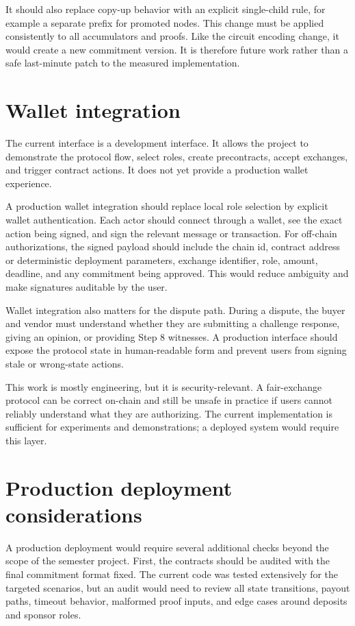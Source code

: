 It should also replace copy-up behavior with an explicit single-child rule, for example a
separate prefix for promoted nodes. This change must be applied consistently to all
accumulators and proofs. Like the circuit encoding change, it would create a new commitment
version. It is therefore future work rather than a safe last-minute patch to the measured
implementation.

\section{Wallet integration}

The current interface is a development interface. It allows the project to demonstrate the
protocol flow, select roles, create precontracts, accept exchanges, and trigger contract
actions. It does not yet provide a production wallet experience.

A production wallet integration should replace local role selection by explicit wallet
authentication. Each actor should connect through a wallet, see the exact action being
signed, and sign the relevant message or transaction. For off-chain authorizations, the
signed payload should include the chain id, contract address or deterministic deployment
parameters, exchange identifier, role, amount, deadline, and any commitment being approved.
This would reduce ambiguity and make signatures auditable by the user.

Wallet integration also matters for the dispute path. During a dispute, the buyer and
vendor must understand whether they are submitting a challenge response, giving an opinion,
or providing Step 8 witnesses. A production interface should expose the protocol state in
human-readable form and prevent users from signing stale or wrong-state actions.

This work is mostly engineering, but it is security-relevant. A fair-exchange protocol can
be correct on-chain and still be unsafe in practice if users cannot reliably understand
what they are authorizing. The current implementation is sufficient for experiments and
demonstrations; a deployed system would require this layer.

\section{Production deployment considerations}

A production deployment would require several additional checks beyond the scope of the
semester project. First, the contracts should be audited with the final commitment format
fixed. The current code was tested extensively for the targeted scenarios, but an audit
would need to review all state transitions, payout paths, timeout behavior, malformed proof
inputs, and edge cases around deposits and sponsor roles.

